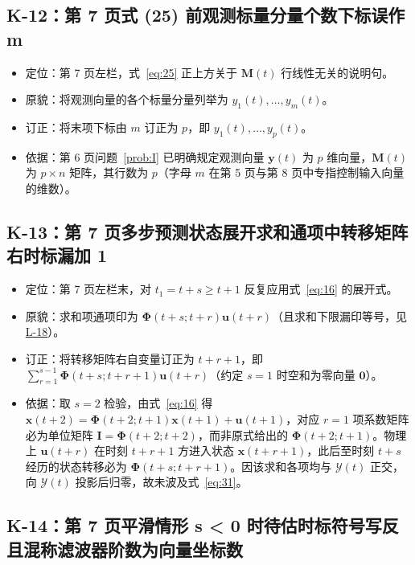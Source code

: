 \subsection{K-12：第 7 页式 (25) 前观测标量分量个数下标误作 m}\label{sec:k12}

\begin{itemize}
\item 定位：第 7 页左栏，式~\eqref{eq:25} 正上方关于 $\bm{M}(t)$ 行线性无关的说明句。
\item 原貌：将观测向量的各个标量分量列举为 $y_1(t), \dots, y_m(t)$。
\item 订正：将末项下标由 $m$ 订正为 $p$，即 $y_1(t), \dots, y_p(t)$。
\item 依据：第 6 页问题~\ref{prob:I} 已明确规定观测向量 $\bm{y}(t)$ 为 $p$ 维向量，$\bm{M}(t)$ 为 $p \times n$ 矩阵，其行数为 $p$（字母 $m$ 在第 5 页与第 8 页中专指控制输入向量的维数）。
\end{itemize}

\subsection{K-13：第 7 页多步预测状态展开求和通项中转移矩阵右时标漏加 1}\label{sec:k13}

\begin{itemize}
\item 定位：第 7 页左栏末，对 $t_1 = t + s \geq t + 1$ 反复应用式~\eqref{eq:16} 的展开式。
\item 原貌：求和项通项印为 $\bm{\Phi}(t + s; t + r)\bm{u}(t + r)$（且求和下限漏印等号，见\hyperref[sec:l-all]{L-18}）。
\item 订正：将转移矩阵右自变量订正为 $t + r + 1$，即 $\sum_{r=1}^{s-1} \bm{\Phi}(t + s; t + r + 1)\bm{u}(t + r)$（约定 $s = 1$ 时空和为零向量 $\bm{0}$）。
\item 依据：取 $s = 2$ 检验，由式~\eqref{eq:16} 得 $\bm{x}(t + 2) = \bm{\Phi}(t + 2; t + 1)\bm{x}(t + 1) + \bm{u}(t + 1)$，对应 $r = 1$ 项系数矩阵必为单位矩阵 $\bm{I} = \bm{\Phi}(t + 2; t + 2)$，而非原式给出的 $\bm{\Phi}(t + 2; t + 1)$。物理上 $\bm{u}(t + r)$ 在时刻 $t + r + 1$ 方进入状态 $\bm{x}(t + r + 1)$，此后至时刻 $t + s$ 经历的状态转移必为 $\bm{\Phi}(t + s; t + r + 1)$。因该求和各项均与 $\mathcal{Y}(t)$ 正交，向 $\mathcal{Y}(t)$ 投影后归零，故未波及式~\eqref{eq:31}。
\end{itemize}

\subsection{K-14：第 7 页平滑情形 s < 0 时待估时标符号写反且混称滤波器阶数为向量坐标数}\label{sec:k14}

